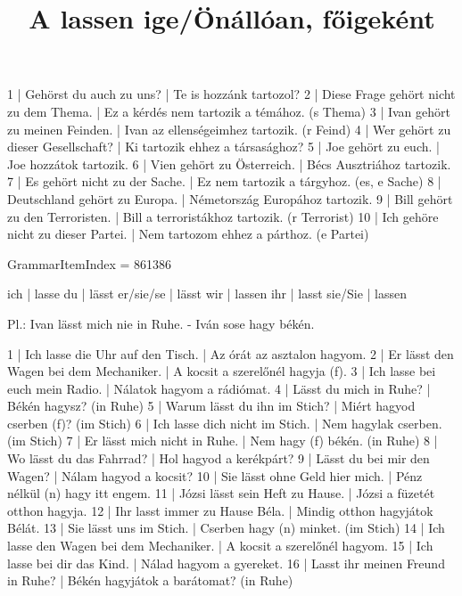 \begin{exmp}
1 | Gehörst du auch zu uns? | Te is hozzánk tartozol?
2 | Diese Frage gehört nicht zu dem Thema. | Ez a kérdés nem tartozik a témához. (s Thema)
3 | Ivan gehört zu meinen Feinden. | Ivan az ellenségeimhez tartozik. (r Feind)
4 | Wer gehört zu dieser Gesellschaft? | Ki tartozik ehhez a társasághoz?
5 | Joe gehört zu euch. | Joe hozzátok tartozik.
6 | Vien gehört zu Österreich. | Bécs Ausztriához tartozik.
7 | Es gehört nicht zu der Sache. | Ez nem tartozik a tárgyhoz. (es, e Sache)
8 | Deutschland gehört zu Europa. | Németország Europához tartozik.
9 | Bill gehört zu den Terroristen. | Bill a terroristákhoz tartozik. (r Terrorist)
10 | Ich gehöre nicht zu dieser Partei. | Nem tartozom ehhez a párthoz. (e Partei)
\end{exmp}

\title{A lassen ige/Önállóan, főigeként}

GrammarItemIndex = 861386

\begin{desc}
ich       | lasse
du        | lässt
er/sie/se | lässt
wir       | lassen
ihr       | lasst
sie/Sie   | lassen

Pl.: Ivan lässt mich nie in Ruhe. - Iván sose hagy békén.
\end{desc}

\begin{exmp}
1 | Ich lasse die Uhr auf den Tisch. | Az órát az asztalon hagyom.
2 | Er lässt den Wagen bei dem Mechaniker. | A kocsit a szerelőnél hagyja (f).
3 | Ich lasse bei euch mein Radio. | Nálatok hagyom a rádiómat.
4 | Lässt du mich in Ruhe? | Békén hagysz? (in Ruhe)
5 | Warum lässt du ihn im Stich? | Miért hagyod cserben (f)? (im Stich)
6 | Ich lasse dich nicht im Stich. | Nem hagylak cserben. (im Stich)
7 | Er lässt mich nicht in Ruhe. | Nem hagy (f) békén. (in Ruhe)
8 | Wo lässt du das Fahrrad? | Hol hagyod a kerékpárt?
9 | Lässt du bei mir den Wagen? | Nálam hagyod a kocsit?
10 | Sie lässt ohne Geld hier mich. | Pénz nélkül (n) hagy itt engem.
11 | Józsi lässt sein Heft zu Hause. | Józsi a füzetét otthon hagyja.
12 | Ihr lasst immer zu Hause Béla. | Mindig otthon hagyjátok Bélát.
13 | Sie lässt uns im Stich. | Cserben hagy (n) minket. (im Stich)
14 | Ich lasse den Wagen bei dem Mechaniker. | A kocsit a szerelőnél hagyom.
15 | Ich lasse bei dir das Kind. | Nálad hagyom a gyereket.
16 | Lasst ihr meinen Freund in Ruhe? | Békén hagyjátok a barátomat? (in Ruhe)
\end{exmp}


